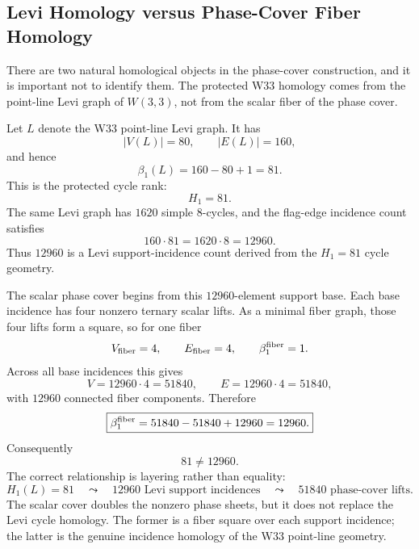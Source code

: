 
\subsection{Levi Homology versus Phase-Cover Fiber Homology}\label{subsec:levi-vs-fiber-homology}

There are two natural homological objects in the phase-cover construction, and
it is important not to identify them.  The protected W33 homology comes from the
point-line Levi graph of $W(3,3)$, not from the scalar fiber of the phase cover.

Let $L$ denote the W33 point-line Levi graph.  It has
\[
|V(L)|=80,\qquad |E(L)|=160,
\]
and hence
\[
\boxed{\beta_1(L)=160-80+1=81.}
\]
This is the protected cycle rank:
\[
\boxed{H_1=81.}
\]
The same Levi graph has $1620$ simple $8$-cycles, and the flag-edge incidence
count satisfies
\[
\boxed{160\cdot81=1620\cdot8=12960.}
\]
Thus $12960$ is a Levi support-incidence count derived from the $H_1=81$ cycle
geometry.

The scalar phase cover begins from this $12960$-element support base.  Each base
incidence has four nonzero ternary scalar lifts.  As a minimal fiber graph, those
four lifts form a square, so for one fiber
\[
V_{\rm fiber}=4,\qquad E_{\rm fiber}=4,\qquad \beta_1^{\rm fiber}=1.
\]
Across all base incidences this gives
\[
V=12960\cdot4=51840,\qquad E=12960\cdot4=51840,
\]
with $12960$ connected fiber components.  Therefore
\[
\boxed{\beta_1^{\rm fiber}=51840-51840+12960=12960.}
\]
Consequently
\[
\boxed{81\ne12960.}
\]
The correct relationship is layering rather than equality:
\[
\boxed{
H_1(L)=81
\quad\leadsto\quad
12960\text{ Levi support incidences}
\quad\leadsto\quad
51840\text{ phase-cover lifts}.
}
\]
The scalar cover doubles the nonzero phase sheets, but it does not replace the
Levi cycle homology.  The former is a fiber square over each support incidence;
the latter is the genuine incidence homology of the W33 point-line geometry.
